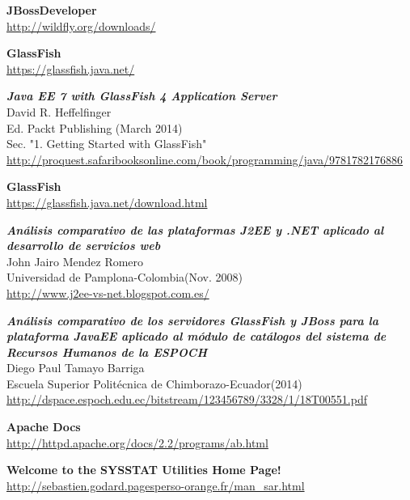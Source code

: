\documentclass[a4paper, 10pt]{article}
\begin{document}
\begin{thebibliography}{10}
	\textbf{JBossDeveloper}\\
		\url{http://wildfly.org/downloads/}
	
	\textbf{GlassFish}\\
		\url{https://glassfish.java.net/}

	\textbf{\textit{Java EE 7 with GlassFish 4 Application Server}}\\
	David R. Heffelfinger\\
	Ed. Packt Publishing (March 2014)\\
	Sec. "1. Getting Started with GlassFish"\\
		\url{http://proquest.safaribooksonline.com/book/programming/java/9781782176886}
		
	\textbf{GlassFish}\\
		\url{https://glassfish.java.net/download.html}
	
	\textbf{\textit{Análisis comparativo de las plataformas J2EE y .NET aplicado
	al desarrollo de servicios web}}\\
	John Jairo Mendez Romero\\
	Universidad de Pamplona-Colombia(Nov. 2008)\\
		\url{http://www.j2ee-vs-net.blogspot.com.es/}
	
	\textbf{\textit{Análisis comparativo de los servidores GlassFish y JBoss para
	la plataforma JavaEE aplicado al módulo de catálogos del sistema de Recursos
	Humanos de la ESPOCH}}\\
	Diego Paul Tamayo Barriga\\
	Escuela Superior Politécnica de Chimborazo-Ecuador(2014)\\
		\url{http://dspace.espoch.edu.ec/bitstream/123456789/3328/1/18T00551.pdf}

	\textbf{Apache Docs}\\
		\url{http://httpd.apache.org/docs/2.2/programs/ab.html}
	
	
	\textbf{Welcome to the SYSSTAT Utilities Home Page!}\\
		\url{http://sebastien.godard.pagesperso-orange.fr/man_sar.html}
\end{thebibliography}
\end{document}
